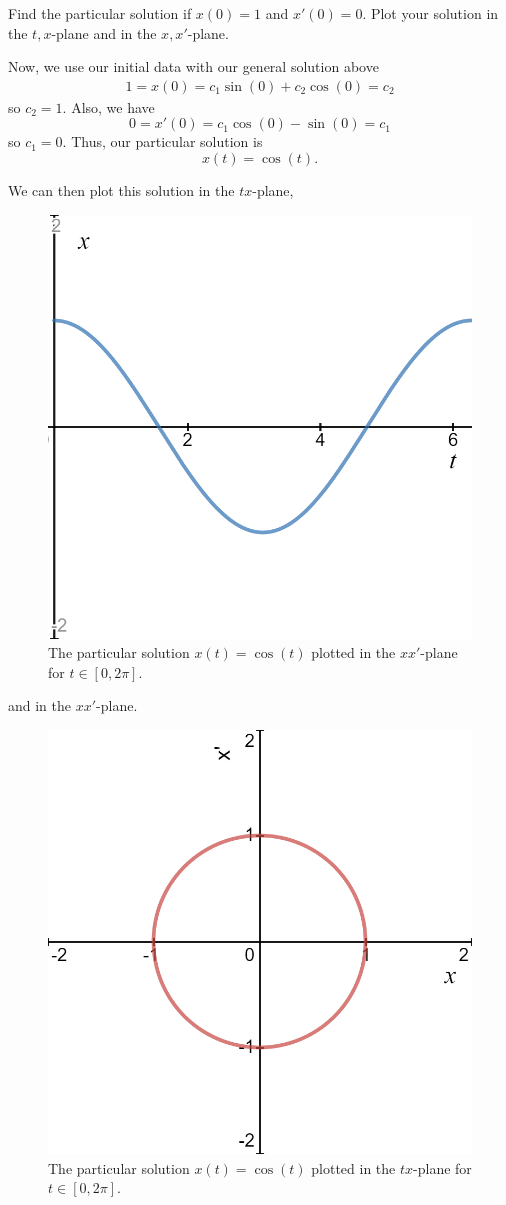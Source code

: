 \documentclass[12pt]{article} %
\begin{document}
\begin{problem}
    Find the particular solution if $x(0)=1$ and $x'(0)=0$. Plot your solution in the $t,x$-plane and in the $x,x'$-plane. 
\end{problem}
\begin{solution}
Now, we use our initial data with our general solution above
\begin{align*}
    1=x(0)=c_1\sin(0)+c_2\cos(0)=c_2
\end{align*}
so $c_2=1$.  Also, we have
\[
0=x'(0)=c_1\cos(0)-\sin(0)=c_1
\]
so $c_1=0$. Thus, our particular solution is
\[
\boxed{x(t) = \cos(t).}
\]

We can then plot this solution in the $tx$-plane,
\begin{figure}[H]
    \centering 
    \includegraphics[width=.5\textwidth]{tx_solution.png}
    \caption{The particular solution $x(t)=\cos(t)$ plotted in the $xx'$-plane for $t\in [0,2\pi]$.}
\end{figure}
and in the $xx'$-plane.
\begin{figure}[H]
    \centering 
    \includegraphics[width=.5\textwidth]{x_xprime_solution.png}
    \caption{The particular solution $x(t)=\cos(t)$ plotted in the $tx$-plane for $t\in [0,2\pi]$.}
\end{figure}
\end{solution}
\end{document}
